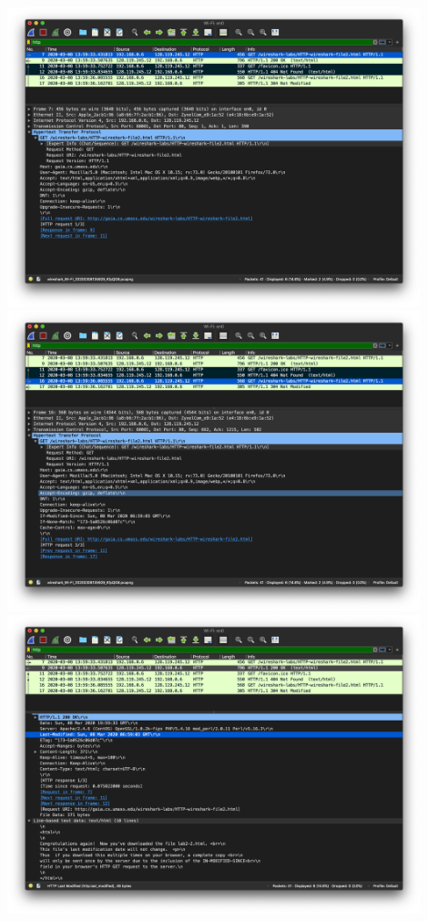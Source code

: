 \documentclass{article}
\begin{document}
\begin{enumerate}
\includegraphics[width=0.90\textwidth]{lab2_part2_get1}\\
\includegraphics[width=0.90\textwidth]{lab2_part2_get2}\\
\includegraphics[width=0.90\textwidth]{lab2_part2_response1}\\

\end{enumerate}
\end{document}
